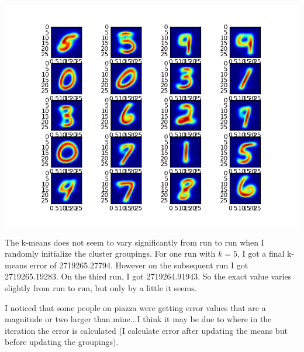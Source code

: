 \documentclass{article}
\begin{document}
\begin{enumerate}
\begin{center}
      \includegraphics[scale=0.5]{kmeans_20}
    \end{center}
\end{enumerate}

The k-means does not seem to vary significantly from run to run when I randomly initialize the cluster groupings. For one run with $k=5$, I got a final k-means error of 2719265.27794. However on the subsequent run I got 2719265.19283. On the third run, I got 2719264.91943. So the exact value varies slightly from run to run, but only by a little it seems.

I noticed that some people on piazza were getting error values that are a magnitude or two larger than mine...I think it may be due to where in the iteration the error is calculated (I calculate error after updating the means but before updating the groupings). 
\end{document}
